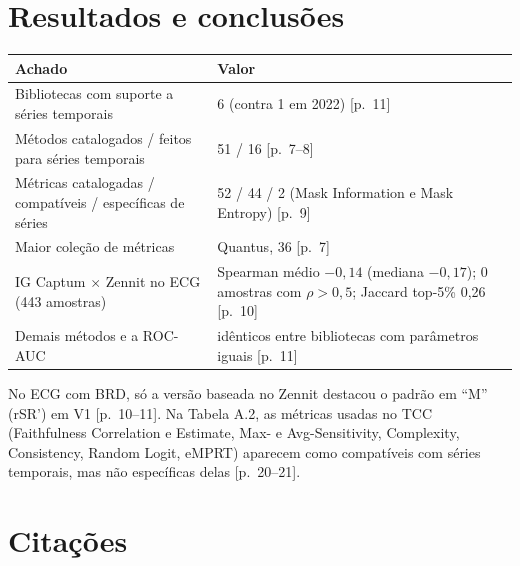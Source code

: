 \documentclass[11pt,a4paper]{article}
\begin{document}
\section{Resultados e conclusões}
\begin{center}\small
\begin{tabularx}{\linewidth}{lX}
\toprule
\textbf{Achado} & \textbf{Valor} \\
\midrule
Bibliotecas com suporte a séries temporais & 6 (contra 1 em 2022) [p.~11] \\
Métodos catalogados / feitos para séries temporais & 51 / 16 [p.~7--8] \\
Métricas catalogadas / compatíveis / específicas de séries & 52 / 44 / 2 (Mask Information e Mask Entropy) [p.~9] \\
Maior coleção de métricas & Quantus, 36 [p.~7] \\
IG Captum $\times$ Zennit no ECG (443 amostras) & Spearman médio $-0{,}14$ (mediana $-0{,}17$); 0 amostras com $\rho > 0{,}5$; Jaccard top-5\% 0,26 [p.~10] \\
Demais métodos e a ROC-AUC & idênticos entre bibliotecas com parâmetros iguais [p.~11] \\
\bottomrule
\end{tabularx}
\end{center}
No ECG com BRD, só a versão baseada no Zennit destacou o padrão em ``M'' (rSR') em V1 [p.~10--11]. Na Tabela A.2, as métricas usadas no TCC (Faithfulness Correlation e Estimate, Max- e Avg-Sensitivity, Complexity, Consistency, Random Logit, eMPRT) aparecem como compatíveis com séries temporais, mas não específicas delas [p.~20--21].

\section{Citações}
\end{document}
